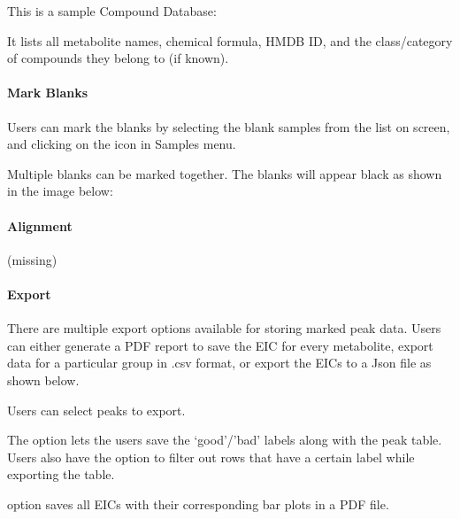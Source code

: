 \documentclass[letterpaper,10pt,english,openany,oneside]{sphinxmanual}
\begin{document}

This is a sample Compound Database:


It lists all metabolite names, chemical formula, HMDB ID, and the class/category of compounds they belong to (if known).


\paragraph{Mark Blanks}
\label{\detokenize{LabeledLCMSMSWorkflow:mark-blanks}}
Users can mark the blanks by selecting the blank samples from the list on screen, and clicking on the  icon  in Samples menu.


Multiple blanks can be marked together. The blanks will appear black as shown in the image below:



\paragraph{Alignment}
\label{\detokenize{LabeledLCMSMSWorkflow:alignment}}
(missing)


\paragraph{Export}
\label{\detokenize{LabeledLCMSMSWorkflow:export}}
There are multiple export options available for storing marked peak data. Users can either generate a PDF report to save the EIC for every metabolite, export data for a particular group in .csv format, or export the EICs to a Json file as shown below.


Users can select  peaks to export.


The  option  lets the users save the ‘good’/’bad’ labels along with the peak table. Users also have the option to filter out rows that have a certain label while exporting the table.

 option  saves all EICs with their corresponding bar plots in a PDF file.
\end{document}
